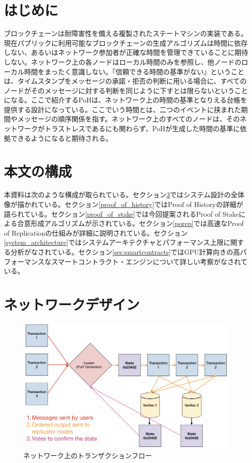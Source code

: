 \documentclass[12pt]{ltjsarticle}
\begin{document}
\section{はじめに}\normalsize
ブロックチェーンは耐障害性を備える複製されたステートマシンの実装である。現在パブリックに利用可能なブロックチェーンの生成アルゴリズムは時間に依存しない、あるいはネットワーク参加者が正確な時間を管理できていることに期待しない\cite{tendermint,hashgraph}。ネットワーク上の各ノードはローカル時間のみを参照し、他ノードのローカル時間をまったく意識しない。『信頼できる時間の基準がない』ということは、タイムスタンプをメッセージの承諾・拒否の判断に用いる場合に、すべてのノードがそのメッセージに対する判断を同じように下すとは限らないということになる。ここで紹介するPoHは、ネットワーク上の時間の基準となりえる台帳を提供する設計になっている。ここでいう時間とは、二つのイベントに挟まれた期間やメッセージの順序関係を指す。ネットワーク上のすべてのノードは、そのネットワークがトラストレスであるにも関わらず、PoHが生成した時間の基準に依拠できるようになると期待される。
\section{本文の構成}
本資料は次のような構成が取られている。セクション\ref{design}ではシステム設計の全体像が描かれている。セクション\ref{proof_of_history}ではProof of Historyの詳細が語られている。セクション\ref{proof_of_stake}では今回提案されるProof of Stakeによる合意形成アルゴリズムが示されている。セクション\ref{porep}では高速なProof of Replicationの仕組みが詳細に説明されている。セクション\ref{system_architecture}ではシステムアーキテクチャとパフォーマンス上限に関する分析がなされている。セクション\ref{sec:smartcontracts}ではGPU計算向きの高パフォーマンスなスマートコントラクト・エンジンについて詳しい考察がなされている。

\section{ネットワークデザイン}\label{design}

\begin{figure}[h]
  \begin{center}
    \centering
    \includegraphics[width=\textwidth]{../../figures/network_design_001.png}
    \caption[Fig 1]{ネットワーク上のトランザクションフロー\label{fig:design}}
  \end{center}
  \end{figure}
\end{document}
